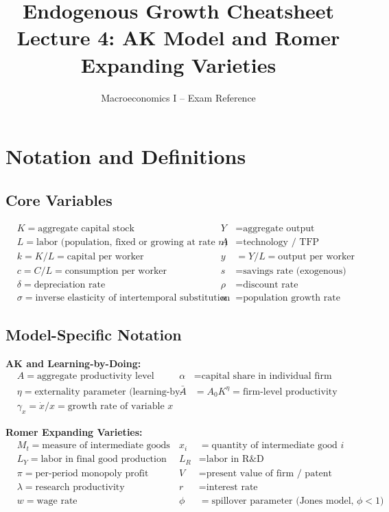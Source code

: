 \documentclass[a4paper,11pt]{article}
\title{\textbf{Endogenous Growth Cheatsheet}\\
\large Lecture 4: AK Model and Romer Expanding Varieties}
\author{Macroeconomics I -- Exam Reference}
\date{}
\begin{document}
\maketitle
\tableofcontents
\clearpage
\pagestyle{plain}

\section{Notation and Definitions}

\subsection*{Core Variables}
\begin{align*}
& K = \text{aggregate capital stock} & Y &= \text{aggregate output} \\
& L = \text{labor (population, fixed or growing at rate } n\text{)} & A &= \text{technology / TFP} \\
& k = K/L = \text{capital per worker} & y &= Y/L = \text{output per worker} \\
& c = C/L = \text{consumption per worker} & s &= \text{savings rate (exogenous)} \\
& \delta = \text{depreciation rate} & \rho &= \text{discount rate} \\
& \sigma = \text{inverse elasticity of intertemporal substitution} & n &= \text{population growth rate}
\end{align*}

\subsection*{Model-Specific Notation}

\textbf{AK and Learning-by-Doing:}
\begin{align*}
& A = \text{aggregate productivity level} & \alpha &= \text{capital share in individual firm production} \\
& \eta = \text{externality parameter (learning-by-doing)} & \bar{A} &= A_0 K^\eta = \text{firm-level productivity} \\
& \gamma_x = \dot{x}/x = \text{growth rate of variable } x
\end{align*}

\textbf{Romer Expanding Varieties:}
\begin{align*}
& M_t = \text{measure of intermediate goods (varieties)} & x_i &= \text{quantity of intermediate good } i \\
& L_Y = \text{labor in final good production} & L_R &= \text{labor in R\&D} \\
& \pi = \text{per-period monopoly profit} & V &= \text{present value of firm / patent} \\
& \lambda = \text{research productivity} & r &= \text{interest rate} \\
& w = \text{wage rate} & \phi &= \text{spillover parameter (Jones model, } \phi < 1\text{)}
\end{align*}
\end{document}
